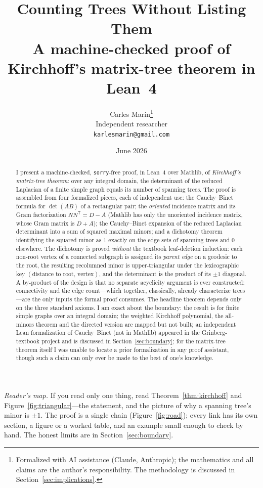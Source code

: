 \documentclass[11pt]{article}
\title{\bf Counting Trees Without Listing Them\\[4pt]
  \large\normalfont A machine-checked proof of Kirchhoff's matrix-tree theorem in Lean~4}
\author{Carles Mar\'in\thanks{Formalized with AI assistance (Claude, Anthropic); the mathematics
and all claims are the author's responsibility. The methodology is discussed in
Section~\ref{sec:implications}.}\\[3pt]
  \normalsize Independent researcher\\
  \normalsize \texttt{karlesmarin@gmail.com}}
\date{June 2026}
\newcommand{\lean}[1]{\texttt{#1}}
\begin{document}
\maketitle

\begin{abstract}
I present a machine-checked, \lean{sorry}-free proof, in Lean~4 over Mathlib, of
\emph{Kirchhoff's matrix-tree theorem}: over any integral domain, the determinant of the reduced
Laplacian of a finite simple graph equals its number of spanning trees. The proof is assembled
from four formalized pieces, each of independent use: the Cauchy--Binet formula for
$\det(AB)$ of a rectangular pair; the \emph{oriented} incidence matrix and its Gram factorization
$NN^{\mathsf T}=D-A$ (Mathlib has only the unoriented incidence matrix, whose Gram matrix is
$D+A$); the Cauchy--Binet expansion of the reduced Laplacian determinant into a sum of squared
maximal minors; and a dichotomy theorem identifying the squared minor as $1$ exactly on the edge
sets of spanning trees and $0$ elsewhere. The dichotomy is proved \emph{without} the textbook
leaf-deletion induction: each non-root vertex of a connected subgraph is assigned its
\emph{parent edge} on a geodesic to the root, the resulting recolumned minor is upper-triangular
under the lexicographic key $(\text{distance to root},\,\text{vertex})$, and the determinant is
the product of its $\pm1$ diagonal. A by-product of the design is that no separate acyclicity
argument is ever constructed: connectivity and the edge count---which together, classically,
already characterize trees---are the only inputs the formal proof consumes. The headline theorem depends only on the three
standard axioms. I am exact about the boundary: the result is for finite simple graphs over an
integral domain; the weighted Kirchhoff polynomial, the all-minors theorem and the directed
version are mapped but not built; an independent Lean formalization of Cauchy--Binet (not in
Mathlib) appeared in the Grinberg-textbook project and is discussed in
Section~\ref{sec:boundary}; for the matrix-tree theorem itself I was unable to locate a prior
formalization in any proof assistant, though such a claim can only ever be made to the best of
one's knowledge.
\end{abstract}

\noindent\emph{Reader's map.} If you read only one thing, read Theorem~\ref{thm:kirchhoff} and
Figure~\ref{fig:triangular}---the statement, and the picture of why a spanning tree's minor is
$\pm1$. The proof is a single chain (Figure~\ref{fig:road}); every link has its own section,
a figure or a worked table, and an example small enough to check by hand. The honest limits are in
Section~\ref{sec:boundary}.
\end{document}
